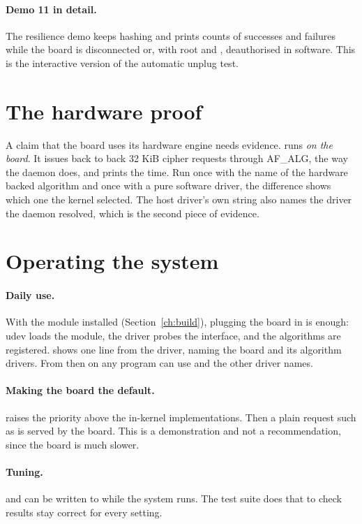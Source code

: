 \paragraph{Demo 11 in detail.} The resilience demo keeps hashing and prints counts of successes and failures while the board is disconnected or, with root and , deauthorised in software. This is the interactive version of the automatic unplug test.

\section{The hardware proof}

A claim that the board uses its hardware engine needs evidence.  runs \emph{on the board}. It issues back to back 32 KiB cipher requests through AF\_ALG, the way the daemon does, and prints the time. Run once with the name of the hardware backed algorithm and once with a pure software driver, the difference shows which one the kernel selected. The host driver's own  string also names the driver the daemon resolved, which is the second piece of evidence.

\section{Operating the system}

\paragraph{Daily use.} With the module installed (Section~\ref{ch:build}), plugging the board in is enough: udev loads the module, the driver probes the interface, and the algorithms are registered.  shows one line from the driver, naming the board and its algorithm drivers. From then on any program can use  and the other driver names.

\paragraph{Making the board the default.}  raises the priority above the in-kernel implementations. Then a plain request such as  is served by the board. This is a demonstration and not a recommendation, since the board is much slower.

\paragraph{Tuning.}  and  can be written to  while the system runs. The test suite does that to check results stay correct for every setting.

